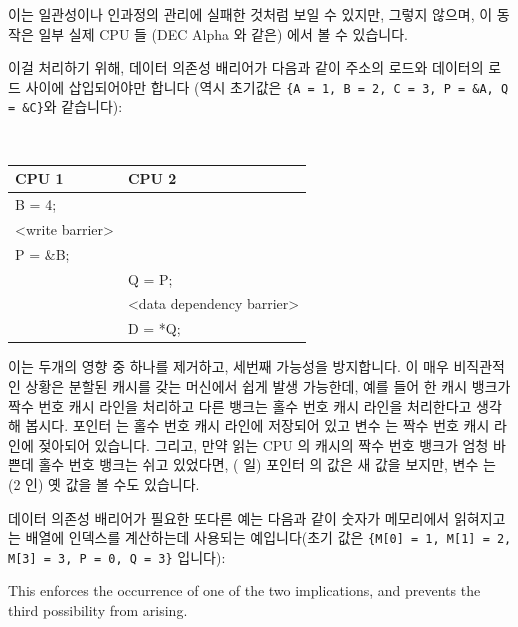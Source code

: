 \begin{enumerate}
이는 일관성이나 인과정의 관리에 실패한 것처럼 보일 수 있지만, 그렇지 않으며, 이
동작은 일부 실제 CPU 들 (DEC Alpha 와 같은) 에서 볼 수 있습니다.

이걸 처리하기 위해, 데이터 의존성 배리어가 다음과 같이 주소의 로드와 데이터의
로드 사이에 삽입되어야만 합니다 (역시 초기값은
{\tt \{A = 1, B = 2, C = 3, P = \&A, Q = \&C\}}와 같습니다):

\vspace{5pt}
\begin{minipage}[t]{\columnwidth}
\tt
\scriptsize
\begin{tabular}{l|p{1.5in}}
	CPU 1 &		CPU 2 \\
	\hline
	B = 4; & \\
	<write barrier> & \\
	P = \&B; &	\\
		&	Q = P; \\
		&	<data dependency barrier> \\
		&	D = *Q; \\
\end{tabular}
\end{minipage}
\vspace{5pt}

이는 두개의 영향 중 하나를 제거하고, 세번째 가능성을 방지합니다.
이 매우 비직관적인 상황은 분할된 캐시를 갖는 머신에서 쉽게 발생 가능한데, 예를
들어 한 캐시 뱅크가 짝수 번호 캐시 라인을 처리하고 다른 뱅크는 홀수 번호 캐시
라인을 처리한다고 생각해 봅시다.
포인터  는 홀수 번호 캐시 라인에 저장되어 있고 변수  는 짝수 번호
캐시 라인에 젖아되어 있습니다.
그리고, 만약 읽는 CPU 의 캐시의 짝수 번호 뱅크가 엄청 바쁜데 홀수 번호 뱅크는
쉬고 있었다면, ( 일) 포인터  의 값은 새 값을 보지만, 변수 
는 (2 인) 옛 값을 볼 수도 있습니다.

데이터 의존성 배리어가 필요한 또다른 예는 다음과 같이 숫자가 메모리에서
읽혀지고는 배열에 인덱스를 계산하는데 사용되는 예입니다(초기 값은 {\tt \{M[0] =
1, M[1] = 2, M[3] = 3, P = 0, Q = 3\}} 입니다):
\iffalse

This enforces the occurrence of one of the two implications, and prevents the
third possibility from arising.


\end{enumerate}
